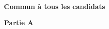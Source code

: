
\textbf{Commun à tous les candidats}

%
%
%
%

\bigskip

\textbf{Partie A}

\medskip

%
%
%
%
%
%

